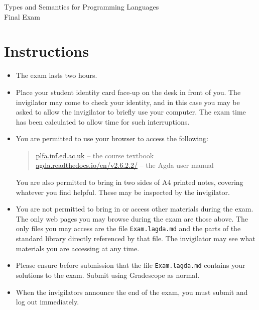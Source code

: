 \documentclass[12pt]{article}
\begin{document}
\pagestyle{empty}
\setcounter{page}{1}

\begin{center}
\large Types and Semantics for Programming Languages \\
\Large Final Exam
\end{center}

\section*{Instructions}

\begin{itemize}

\item
  The exam lasts two hours.

\item
  Place your student identity card face-up on the desk in front of you.  The
  invigilator may come to check your identity, and in this case you may be asked
  to allow the invigilator to briefly use your computer.  The exam time has been
  calculated to allow time for such interruptions.

\item
  You are permitted to use your browser to access the following:
  \begin{quote}
    \url{plfa.inf.ed.ac.uk} -- the course textbook \\
    \url{agda.readthedocs.io/en/v2.6.2.2/} -- the Agda user manual
  \end{quote}
  You are also permitted to bring in two sides of A4 printed notes,
  covering whatever you find helpful. These may be inspected by the
  invigilator.

\item
  You are not permitted to bring in or access other materials during
  the exam. The only web pages you may browse during the exam are
  those above. The only files you may access are the file \texttt{Exam.lagda.md}
  and the parts of the standard library directly referenced by
  that file. The invigilator may see what materials you are accessing
  at any time.

\item
  Please ensure before submission that the file
  \texttt{Exam.lagda.md} contains your solutions to the exam.
  Submit using Gradescope as normal.

\item
  When the invigilators announce the end of the exam, you must
  submit and log out immediately.

\end{itemize}
\end{document}
